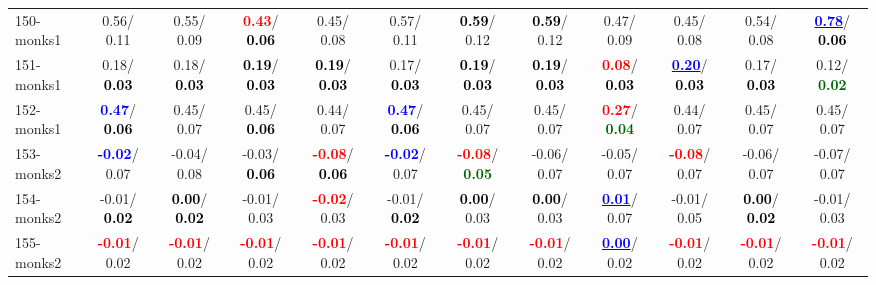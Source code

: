 \begin{table}[h]
\begin{center}
{\begin{tabular}{lc|c|c|c|c|c|c|c|c|c|c}
150-monks1 &   0.56/  0.11 &   0.55/  0.09 & \textcolor{red}{\textbf{  0.43}}/\textcolor{black}{\textbf{  0.06}} &   0.45/  0.08 &   0.57/  0.11 & \textcolor{black}{\textbf{  0.59}}/  0.12 & \textcolor{black}{\textbf{  0.59}}/  0.12 &   0.47/  0.09 &   0.45/  0.08 &   0.54/  0.08 & \underline{\textcolor{blue}{\textbf{  0.78}}}/\textcolor{black}{\textbf{  0.06}} \\
151-monks1 &   0.18/\textcolor{black}{\textbf{  0.03}} &   0.18/\textcolor{black}{\textbf{  0.03}} & \textcolor{black}{\textbf{  0.19}}/\textcolor{black}{\textbf{  0.03}} & \textcolor{black}{\textbf{  0.19}}/\textcolor{black}{\textbf{  0.03}} &   0.17/\textcolor{black}{\textbf{  0.03}} & \textcolor{black}{\textbf{  0.19}}/\textcolor{black}{\textbf{  0.03}} & \textcolor{black}{\textbf{  0.19}}/\textcolor{black}{\textbf{  0.03}} & \textcolor{red}{\textbf{  0.08}}/\textcolor{black}{\textbf{  0.03}} & \underline{\textcolor{blue}{\textbf{  0.20}}}/\textcolor{black}{\textbf{  0.03}} &   0.17/\textcolor{black}{\textbf{  0.03}} &   0.12/\textcolor{darkgreen}{\textbf{  0.02}} \\
152-monks1 & \textcolor{blue}{\textbf{  0.47}}/\textcolor{black}{\textbf{  0.06}} &   0.45/  0.07 &   0.45/\textcolor{black}{\textbf{  0.06}} &   0.44/  0.07 & \textcolor{blue}{\textbf{  0.47}}/\textcolor{black}{\textbf{  0.06}} &   0.45/  0.07 &   0.45/  0.07 & \textcolor{red}{\textbf{  0.27}}/\textcolor{darkgreen}{\textbf{  0.04}} &   0.44/  0.07 &   0.45/  0.07 &   0.45/  0.07 \\
153-monks2 & \textcolor{blue}{\textbf{ -0.02}}/  0.07 &  -0.04/  0.08 &  -0.03/\textcolor{black}{\textbf{  0.06}} & \textcolor{red}{\textbf{ -0.08}}/\textcolor{black}{\textbf{  0.06}} & \textcolor{blue}{\textbf{ -0.02}}/  0.07 & \textcolor{red}{\textbf{ -0.08}}/\textcolor{darkgreen}{\textbf{  0.05}} &  -0.06/  0.07 &  -0.05/  0.07 & \textcolor{red}{\textbf{ -0.08}}/  0.07 &  -0.06/  0.07 &  -0.07/  0.07 \\
154-monks2 &  -0.01/\textcolor{black}{\textbf{  0.02}} & \textcolor{black}{\textbf{  0.00}}/\textcolor{black}{\textbf{  0.02}} &  -0.01/  0.03 & \textcolor{red}{\textbf{ -0.02}}/  0.03 &  -0.01/\textcolor{black}{\textbf{  0.02}} & \textcolor{black}{\textbf{  0.00}}/  0.03 & \textcolor{black}{\textbf{  0.00}}/  0.03 & \underline{\textcolor{blue}{\textbf{  0.01}}}/  0.07 &  -0.01/  0.05 & \textcolor{black}{\textbf{  0.00}}/\textcolor{black}{\textbf{  0.02}} &  -0.01/  0.03 \\
155-monks2 & \textcolor{red}{\textbf{ -0.01}}/  0.02 & \textcolor{red}{\textbf{ -0.01}}/  0.02 & \textcolor{red}{\textbf{ -0.01}}/  0.02 & \textcolor{red}{\textbf{ -0.01}}/  0.02 & \textcolor{red}{\textbf{ -0.01}}/  0.02 & \textcolor{red}{\textbf{ -0.01}}/  0.02 & \textcolor{red}{\textbf{ -0.01}}/  0.02 & \underline{\textcolor{blue}{\textbf{  0.00}}}/  0.02 & \textcolor{red}{\textbf{ -0.01}}/  0.02 & \textcolor{red}{\textbf{ -0.01}}/  0.02 & \textcolor{red}{\textbf{ -0.01}}/  0.02 \\

\end{tabular}}
\end{center}
\end{table}
